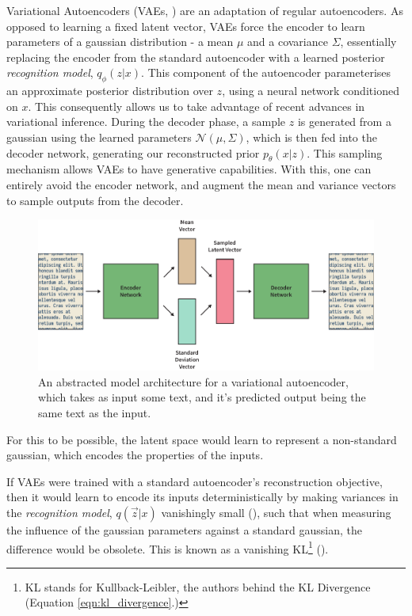 \documentclass[12pt,twoside]{report}
\begin{document}
Variational Autoencoders (VAEs, \cite{kingma_auto-encoding_2013}) are an adaptation of regular autoencoders. As opposed to learning a fixed latent vector, VAEs force the encoder to learn parameters of a gaussian distribution - a mean $\mu$ and a covariance $\Sigma$, essentially replacing the encoder from the standard autoencoder with a learned posterior \textit{recognition model}, $q_\phi(z|x)$. This component of the autoencoder parameterises an approximate posterior distribution over $z$, using a neural network conditioned on $x$. This consequently allows us to take advantage of recent advances in variational inference.  During the decoder phase, a sample $z$ is generated from a gaussian using the learned parameters $\mathcal{N}(\mu, \Sigma)$, which is then fed into the decoder network, generating our reconstructed prior  $p_\theta(x|z)$. This sampling mechanism allows VAEs to have generative capabilities. With this, one can entirely avoid the encoder network, and augment the mean and variance vectors to sample outputs from the decoder.

\begin{figure}[!ht]
	\centering
	\includegraphics[width=150mm]{diagrams/variational_autoencoders.pdf}
	\caption{An abstracted model architecture for a variational autoencoder, which takes as input some text, and it's predicted output being the same text as the input.\label{vae}}
	\end{figure}
	
For this to be possible, the latent space would learn to represent a non-standard gaussian, which encodes the properties of the inputs.

If VAEs were trained with a standard autoencoder's reconstruction objective, then it would learn to encode its inputs deterministically by making variances in the \textit{recognition model}, $q(\overrightarrow{z}|x)$ vanishingly small (\cite{raiko_techniques_2014}), such that when measuring the influence of the gaussian parameters against a standard gaussian, the difference would be obsolete. This is known as a vanishing KL\footnote{KL stands for Kullback-Leibler, the authors behind the KL Divergence (Equation \ref{eqn:kl_divergence}.)} (\cite{fu*_cyclical_2019}). 
\end{document}
